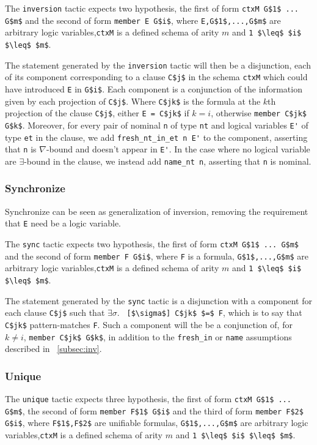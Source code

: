 \documentclass[nocopyrightspace,authoryear]{sigplanconf}
\begin{document}
The \lstinline|inversion| tactic expects two hypothesis, the first of form \lstinline|ctxM G$1$ ... G$m$| and the second of form \lstinline|member E G$i$|, where \lstinline|E,G$1$,...,G$m$| are arbitrary logic variables,\lstinline|ctxM| is a defined schema of arity $m$ and \lstinline|1 $\leq$ $i$ $\leq$ $m$|.

The statement generated by the \lstinline|inversion| tactic will then be a disjunction, each of its component corresponding to a clause \lstinline|C$j$| in the schema \lstinline|ctxM| which could have introduced \lstinline|E| in \lstinline|G$i$|. Each component is a conjunction of the information given by each projection of \lstinline|C$j$|. Where \lstinline|C$jk$| is the formula at the $k$th projection of the clause \lstinline|C$j$|, either \lstinline|E = C$jk$| if $k=i$, otherwise \lstinline|member C$jk$ G$k$|. Moreover, for every pair of nominal \lstinline|n| of type \lstinline|nt| and logical variables \lstinline|E'| of type \lstinline|et| in the clause, we add \lstinline|fresh_nt_in_et n E'| to the component, asserting that \lstinline|n| is $\nabla$-bound and doesn't appear in \lstinline|E'|. In the case where no logical variable are $\exists$-bound in the clause, we instead add \lstinline|name_nt n|, asserting that \lstinline|n| is nominal.

\subsubsection{Synchronize}
Synchronize can be seen as generalization of inversion, removing the requirement that \lstinline|E| need be a logic variable. 

The \lstinline|sync| tactic expects two hypothesis, the first of form \lstinline|ctxM G$1$ ... G$m$| and the second of form \lstinline|member F G$i$|, where \lstinline|F| is a formula, \lstinline|G$1$,...,G$m$| are arbitrary logic variables,\lstinline|ctxM| is a defined schema of arity $m$ and \lstinline|1 $\leq$ $i$ $\leq$ $m$|.

The statement generated by the \lstinline|sync| tactic is a disjunction with a component for each clause \lstinline|C$j$| such that $\exists \sigma.$ \lstinline| [$\sigma$] C$jk$ $=$ F|, which is to say that \lstinline|C$jk$| pattern-matches \lstinline|F|. Such a component will the be a conjunction of, for $k \neq i$, \lstinline|member C$jk$ G$k$|, in addition to the \lstinline|fresh_in| or \lstinline|name| assumptions described in ~\ref{subsec:inv}.

\subsubsection{Unique}
The \lstinline|unique| tactic expects three hypothesis, the first of form \lstinline|ctxM G$1$ ... G$m$|, the second of form \lstinline|member F$1$ G$i$| and the third of form \lstinline|member F$2$ G$i$|, where \lstinline|F$1$,F$2$| are unifiable formulas, \lstinline|G$1$,...,G$m$| are arbitrary logic variables,\lstinline|ctxM| is a defined schema of arity $m$ and \lstinline|1 $\leq$ $i$ $\leq$ $m$|.
\end{document}
